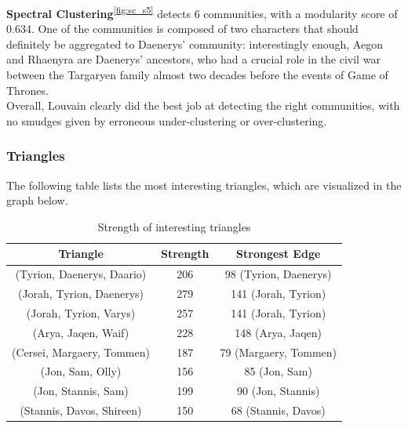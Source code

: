 \documentclass[10pt,twocolumn,letterpaper]{article}
\begin{document}
\textbf{Spectral Clustering}\textsuperscript{\ref{fig:sc_s5}} detects 6 communities, with a modularity score of 0.634. One of the communities is composed of two characters that should definitely be aggregated to Daenerys' community: interestingly enough, Aegon and Rhaenyra are Daenerys' ancestors, who had a crucial role in the civil war between the Targaryen family almost two decades before the events of Game of Thrones. \\

Overall, Louvain clearly did the best job at detecting the right communities, with no smudges given by erroneous under-clustering or over-clustering.

\subsubsection{Triangles}

The following table lists the most interesting triangles, which are visualized in the graph below.

\begin{table}[h!]
    \centering
    \small
    \begin{tabular}{c|c|c}
        Triangle & Strength & Strongest Edge  \\
        \hline
        (Tyrion, Daenerys, Daario) & 206 & 98 (Tyrion, Daenerys) \\
        (Jorah, Tyrion, Daenerys) & 279 & 141 (Jorah, Tyrion) \\
        (Jorah, Tyrion, Varys) & 257 & 141 (Jorah, Tyrion) \\
        (Arya, Jaqen, Waif) & 228 & 148 (Arya, Jaqen) \\
        (Cersei, Margaery, Tommen) & 187 & 79 (Margaery, Tommen) \\
        (Jon, Sam, Olly) & 156 & 85 (Jon, Sam) \\
        (Jon, Stannis, Sam) & 199 & 90 (Jon, Stannis) \\
        (Stannis, Davos, Shireen) & 150 & 68 (Stannis, Davos) \\
        \hline 
    \end{tabular} \\
    \vspace{0.2cm}
    \caption{Strength of interesting triangles}
    \label{tab:my_label}
\end{table}
\end{document}

